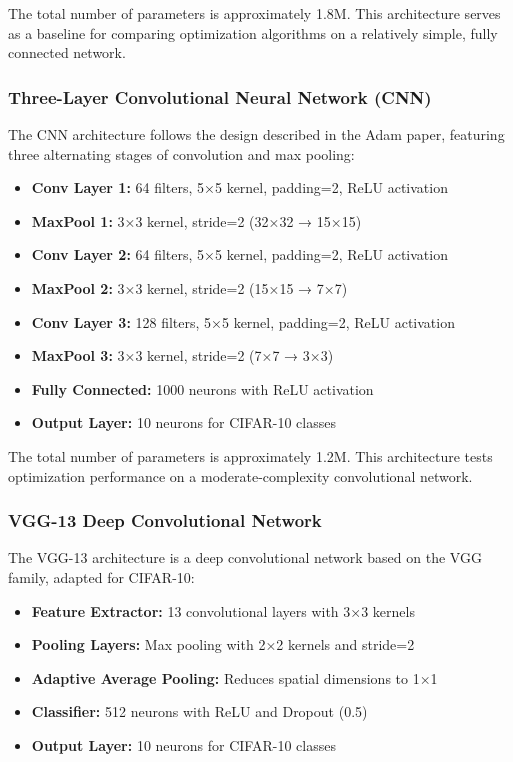 \documentclass[12pt]{article}
\begin{document}
The total number of parameters is approximately 1.8M. This architecture serves as a baseline for comparing optimization algorithms on a relatively simple, fully connected network.

\subsubsection{Three-Layer Convolutional Neural Network (CNN)}

The CNN architecture follows the design described in the Adam paper, featuring three alternating stages of convolution and max pooling:

\begin{itemize}
    \item \textbf{Conv Layer 1:} 64 filters, 5×5 kernel, padding=2, ReLU activation
    \item \textbf{MaxPool 1:} 3×3 kernel, stride=2 (32×32 → 15×15)
    \item \textbf{Conv Layer 2:} 64 filters, 5×5 kernel, padding=2, ReLU activation
    \item \textbf{MaxPool 2:} 3×3 kernel, stride=2 (15×15 → 7×7)
    \item \textbf{Conv Layer 3:} 128 filters, 5×5 kernel, padding=2, ReLU activation
    \item \textbf{MaxPool 3:} 3×3 kernel, stride=2 (7×7 → 3×3)
    \item \textbf{Fully Connected:} 1000 neurons with ReLU activation
    \item \textbf{Output Layer:} 10 neurons for CIFAR-10 classes
\end{itemize}

The total number of parameters is approximately 1.2M. This architecture tests optimization performance on a moderate-complexity convolutional network.

\subsubsection{VGG-13 Deep Convolutional Network}

The VGG-13 architecture is a deep convolutional network based on the VGG family, adapted for CIFAR-10:

\begin{itemize}
    \item \textbf{Feature Extractor:} 13 convolutional layers with 3×3 kernels
    \item \textbf{Pooling Layers:} Max pooling with 2×2 kernels and stride=2
    \item \textbf{Adaptive Average Pooling:} Reduces spatial dimensions to 1×1
    \item \textbf{Classifier:} 512 neurons with ReLU and Dropout (0.5)
    \item \textbf{Output Layer:} 10 neurons for CIFAR-10 classes
\end{itemize}
\end{document}
